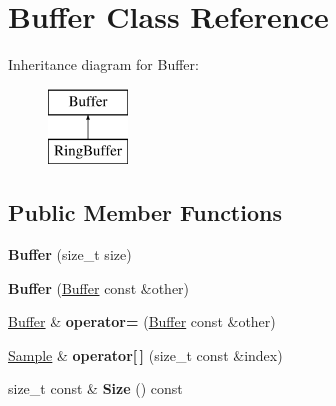 \hypertarget{class_buffer}{\section{Buffer Class Reference}
\label{class_buffer}
}
Inheritance diagram for Buffer\+:\begin{figure}[H]
\begin{center}
\leavevmode
\includegraphics[height=2.000000cm]{class_buffer}
\end{center}
\end{figure}
\subsection*{Public Member Functions}
\begin{DoxyCompactItemize}
\item 
\hypertarget{class_buffer_a10e19c7983dc2c4d08562fd4624748bf}{{\bfseries Buffer} (size\+\_\+t size)}\label{class_buffer_a10e19c7983dc2c4d08562fd4624748bf}

\item 
\hypertarget{class_buffer_a32e454a97f5e74b80299bfde2c8dfc33}{{\bfseries Buffer} (\hyperlink{class_buffer}{Buffer} const \&other)}\label{class_buffer_a32e454a97f5e74b80299bfde2c8dfc33}

\item 
\hypertarget{class_buffer_af5236195cd5cb175c7c6e265ef8f264a}{\hyperlink{class_buffer}{Buffer} \& {\bfseries operator=} (\hyperlink{class_buffer}{Buffer} const \&other)}\label{class_buffer_af5236195cd5cb175c7c6e265ef8f264a}

\item 
\hypertarget{class_buffer_a4327b30085e448c2f2af6308579fc070}{\hyperlink{class_sample}{Sample} \& {\bfseries operator\mbox{[}$\,$\mbox{]}} (size\+\_\+t const \&index)}\label{class_buffer_a4327b30085e448c2f2af6308579fc070}

\item 
\hypertarget{class_buffer_a9a8dce3af1b362221bb2bd3181aa8b3c}{size\+\_\+t const \& {\bfseries Size} () const }\label{class_buffer_a9a8dce3af1b362221bb2bd3181aa8b3c}

\end{DoxyCompactItemize}
